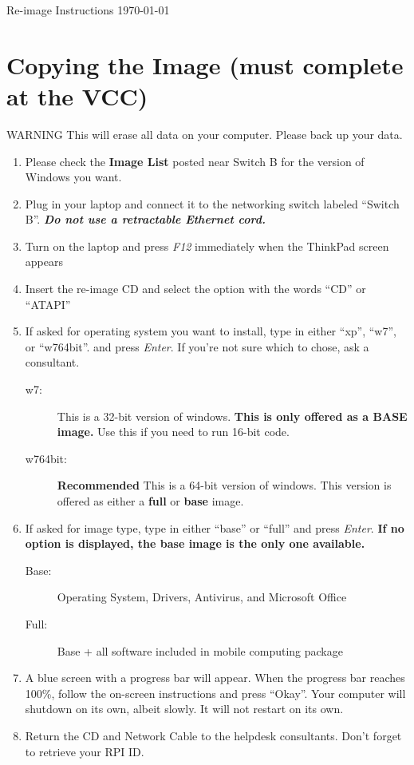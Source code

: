\documentclass[10pt]{article}
\begin{document}
\begin{flushright}
Re-image Instructions \today
\end{flushright}
\section{Copying the Image (must complete at the VCC)}
{\sc WARNING This will erase all data on your computer. Please back up your data.}
\begin{enumerate}
\item Please check the {\bf Image List} posted near Switch B for the version of Windows you want.
\item Plug in your laptop and connect it to the networking switch labeled ``Switch B''. \emph{\bf Do not use a retractable Ethernet cord.}
\item Turn on the laptop and press \emph{F12} immediately when the ThinkPad screen appears
\item Insert the re-image CD and select the option with the words ``CD'' or ``ATAPI''
\item If asked for operating system you want to install, type in either ``xp'', ``w7'', or ``w764bit''. and press \emph{Enter}. If you're not sure which to chose, ask a consultant.
\begin{description}
\item[w7:] This is a 32-bit version of windows. {\bf This is only offered as a BASE image.} Use this if you need to run 16-bit code.
\item[w764bit:] {\bf Recommended} This is a 64-bit version of windows. This version is offered as either a {\bf full} or {\bf base} image.
\end{description}
\item If asked for image type, type in either ``base'' or ``full'' and press \emph{Enter}. {\bf If no option is displayed, the base image is the only one available.}
\begin{description}
\item[Base:] Operating System, Drivers, Antivirus, and Microsoft Office
\item[Full:] Base + all software included in mobile computing package
\end{description}
\item A blue screen with a progress bar will appear. When the progress bar reaches 100\%, follow the on-screen instructions and press ``Okay''. Your computer will shutdown on its own, albeit slowly. It will not restart on its own.
\item Return the CD and Network Cable to the helpdesk consultants. Don't forget to retrieve your RPI ID.

\end{enumerate}
\end{document}
